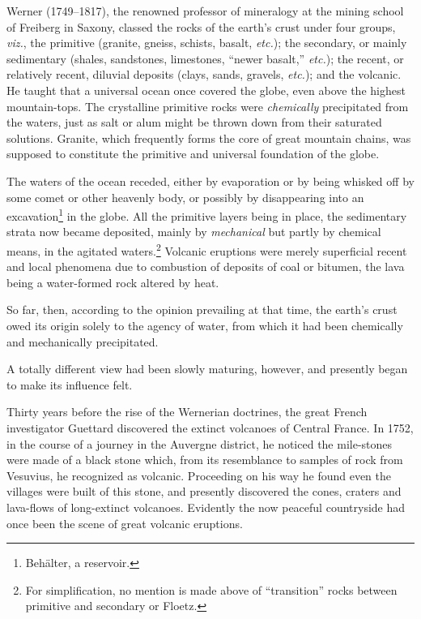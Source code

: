 \documentclass[a4paper, 12pt, oneside, landscape]{article}
\begin{document}
Werner (1749--1817), the renowned professor of mineralogy at the mining school of Freiberg in Saxony, classed the rocks of the earth's crust under four groups, \emph{viz.}, the primitive (granite, gneiss, schists, basalt, \emph{etc.}); the secondary, or mainly sedimentary (shales, sandstones, limestones, ``newer basalt,'' \emph{etc.}); the recent, or relatively recent, diluvial deposits (clays, sands, gravels, \emph{etc.}); and the volcanic. He taught that a universal ocean once covered the globe, even above the highest mountain-tops. The crystalline primitive rocks were \emph{chemically} precipitated from the waters, just as salt or alum might be thrown down from their saturated solutions. Granite, which frequently forms the core of great mountain chains, was supposed to constitute the primitive and universal foundation of the globe.

The waters of the ocean receded, either by evaporation or by being whisked off by some comet or other heavenly body, or possibly by disappearing into an excavation\footnote{Behälter, a reservoir.} in the globe. All the primitive layers being in place, the sedimentary strata now became deposited, mainly by \emph{mechanical} but partly by chemical means, in the agitated waters.\footnote{For simplification, no mention is made above of ``transition'' rocks between primitive and secondary or Floetz.} Volcanic eruptions were merely superficial recent and local phenomena due to combustion of deposits of coal or bitumen, the lava being a water-formed rock altered by heat.

So far, then, according to the opinion prevailing at that time, the earth's crust owed its origin solely to the agency of water, from which it had been chemically and mechanically precipitated.

A totally different view had been slowly maturing, however, and presently began to make its influence felt.

Thirty years before the rise of the Wernerian doctrines, the great French investigator Guettard discovered the extinct volcanoes of Central France. In 1752, in the course of a journey in the Auvergne district, he noticed the mile-stones were made of a black stone which, from its resemblance to samples of rock from Vesuvius, he recognized as volcanic. Proceeding on his way he found even the villages were built of this stone, and presently discovered the cones, craters and lava-flows of long-extinct volcanoes. Evidently the now peaceful countryside had once been the scene of great volcanic eruptions.
\end{document}
